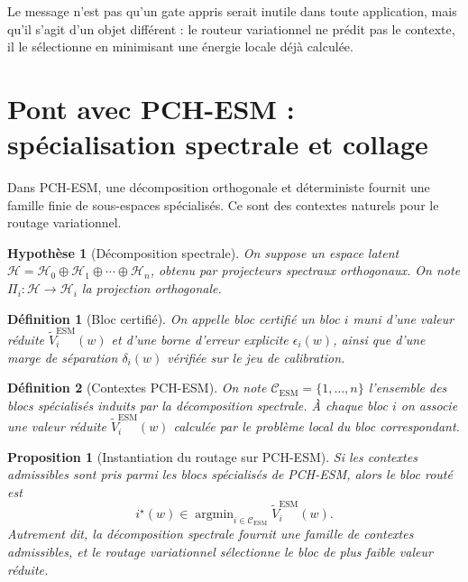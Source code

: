 \documentclass[11pt,a4paper]{article}
\newtheorem{definition}{Définition}[section]
\newtheorem{assumption}{Hypothèse}[section]
\newtheorem{proposition}{Proposition}[section]
\DeclareMathOperator{\argmin}{argmin}
\newcommand{\Hh}{\mathcal H}
\newcommand{\Ccal}{\mathcal C}
\begin{document}
Le message n'est pas qu'un gate appris serait inutile dans toute application, mais qu'il s'agit d'un objet différent : le routeur variationnel ne prédit pas le contexte, il le sélectionne en minimisant une énergie locale déjà calculée.

\section{Pont avec PCH-ESM : spécialisation spectrale et collage}

Dans PCH-ESM, une décomposition orthogonale et déterministe fournit une famille finie de sous-espaces spécialisés. Ce sont des contextes naturels pour le routage variationnel.

\begin{assumption}[Décomposition spectrale]
On suppose un espace latent \(\Hh=\Hh_0\oplus \Hh_1\oplus\cdots\oplus \Hh_n\), obtenu par projecteurs spectraux orthogonaux. On note \(\Pi_i:\Hh\to\Hh_i\) la projection orthogonale.
\end{assumption}

\begin{definition}[Bloc certifié]
On appelle bloc certifié un bloc \(i\) muni d'une valeur réduite \(\widetilde V_i^{\mathrm{ESM}}(w)\) et d'une borne d'erreur explicite \(\epsilon_i(w)\), ainsi que d'une marge de séparation \(\delta_i(w)\) vérifiée sur le jeu de calibration.
\end{definition}

\begin{definition}[Contextes PCH-ESM]
On note \(\Ccal_{\mathrm{ESM}}=\{1,\dots,n\}\) l'ensemble des blocs spécialisés induits par la décomposition spectrale. À chaque bloc \(i\) on associe une valeur réduite \(\widetilde V_i^{\mathrm{ESM}}(w)\) calculée par le problème local du bloc correspondant.
\end{definition}

\begin{proposition}[Instantiation du routage sur PCH-ESM]
Si les contextes admissibles sont pris parmi les blocs spécialisés de PCH-ESM, alors le bloc routé est
\[
i^\star(w)\in\argmin_{i\in\Ccal_{\mathrm{ESM}}}\widetilde V_i^{\mathrm{ESM}}(w).
\]
Autrement dit, la décomposition spectrale fournit une famille de contextes admissibles, et le routage variationnel sélectionne le bloc de plus faible valeur réduite.
\end{proposition}
\end{document}
